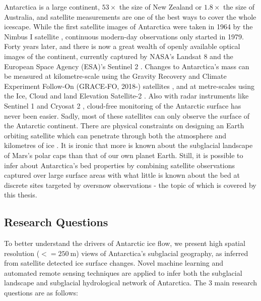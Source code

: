 Antarctica is a large continent, $53\times$ the size of New Zealand or $1.8\times$ the size of Australia, and satellite measurements are one of the best ways to cover the whole icescape.
While the first satellite images of Antarctica were taken in 1964 by the Nimbus I satellite \citep{MeierNewestimatesArctic2013}, continuous modern-day observations only started in 1979.
Forty years later, and there is now a great wealth of openly available optical images of the continent, currently captured by NASA's Landsat 8 \citep[][]{RoyLandsat8Scienceproduct2014} and the European Space Agency (ESA)'s Sentinel 2 \citep{DruschSentinel2ESAOptical2012}.
Changes to Antarctica's mass can be measured at kilometre-scale using the Gravity Recovery and Climate Experiment Follow‐On (GRACE‐FO, 2018-) satellites \citep{LandererExtendingGlobalMass2020}, and at metre-scales using the Ice, Cloud and land Elevation Satellite-2 \citep[ICESat-2, 2018-;][]{MarkusIceCloudland2017}.
Also with radar instruments like Sentinel 1 \citep{AttemaSentinel1missionoverview2009} and Cryosat 2 \citep{WinghamCryoSatmissiondetermine2006}, cloud-free monitoring of the Antarctic surface has never been easier.
Sadly, most of these satellites can only observe the surface of the Antarctic continent.
There are physical constraints on designing an Earth orbiting satellite which can penetrate through both the atmosphere and kilometres of ice \citep{GogineniCubeSatTrainRadar2018,CulbergFirnClutterConstraints2020}.
It is ironic that more is known about the subglacial landscape of Mars's polar caps \citep{OroseiRadarevidencesubglacial2018,ArnoldModeledSubglacialWater2019,LauroMultiplesubglacialwater2020} than that of our own planet Earth.
Still, it is possible to infer about Antarctica's bed properties by combining satellite observations captured over large surface areas with what little is known about the bed at discrete sites targeted by oversnow observations - the topic of which is covered by this thesis.

\subsection{Research Questions}

To better understand the drivers of Antarctic ice flow, we present high spatial resolution ($<= \SI{250}{\metre}$) views of Antarctica's subglacial geography, as inferred from satellite detected ice surface changes.
Novel machine learning and automated remote sensing techniques are applied to infer both the subglacial landscape and subglacial hydrological network of Antarctica.
The 3 main research questions are as follows:

